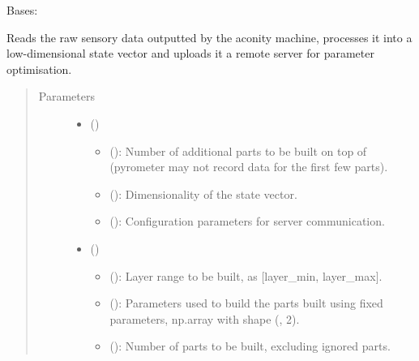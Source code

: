 \documentclass[letterpaper,10pt,english,openany,oneside]{sphinxmanual}
\begin{document}
\begin{fulllineitems}
\label{\detokenize{_modules/machine:machine.Machine}}
Bases: 

Reads the raw sensory data outputted by the aconity machine, processes it
into a low-dimensional state vector and uploads it a remote server for
parameter optimisation.
\begin{quote}\begin{description}
\item[{Parameters}] \leavevmode\begin{itemize}
\item {} 
 () \textendash{} \begin{itemize}
\item {} 
 (): Number of additional parts to be built on top of  (pyrometer may not record data for the first few parts).

\item {} 
 (): Dimensionality of the state vector.

\item {} 
 (): Configuration parameters for server communication.

\end{itemize}


\item {} 
 () \textendash{} \begin{itemize}
\item {} 
 (): Layer range to be built, as {[}layer\_min, layer\_max{]}.

\item {} 
 (): Parameters used to build the parts built using fixed parameters, np.array with shape (, 2).

\item {} 
 (): Number of parts to be built, excluding ignored parts.


\end{itemize}
\end{itemize}
\end{description}
\end{quote}
\end{fulllineitems}
\end{document}
